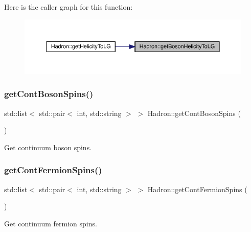 Here is the caller graph for this function\+:
\nopagebreak
\begin{figure}[H]
\begin{center}
\leavevmode
\includegraphics[width=350pt]{d1/daf/namespaceHadron_a82bbcfd69a36dd0f63d6181069ff7393_icgraph}
\end{center}
\end{figure}
\mbox{\label{namespaceHadron_a758e677215948a2af60fc6fee269d410}} 
\subsubsection{\texorpdfstring{getContBosonSpins()}{getContBosonSpins()}}
{\footnotesize\ttfamily std\+::list$<$ std\+::pair$<$ int, std\+::string $>$ $>$ Hadron\+::get\+Cont\+Boson\+Spins (\begin{DoxyParamCaption}{ }\end{DoxyParamCaption})}



Get continuum boson spins. 

\mbox{\label{namespaceHadron_a7131ce7dd50310f2beeabb2a83dde484}} 
\subsubsection{\texorpdfstring{getContFermionSpins()}{getContFermionSpins()}}
{\footnotesize\ttfamily std\+::list$<$ std\+::pair$<$ int, std\+::string $>$ $>$ Hadron\+::get\+Cont\+Fermion\+Spins (\begin{DoxyParamCaption}{ }\end{DoxyParamCaption})}



Get continuum fermion spins. 

\mbox{\label{namespaceHadron_a6efae379facc253e72b35cf4d235dc88}} 
